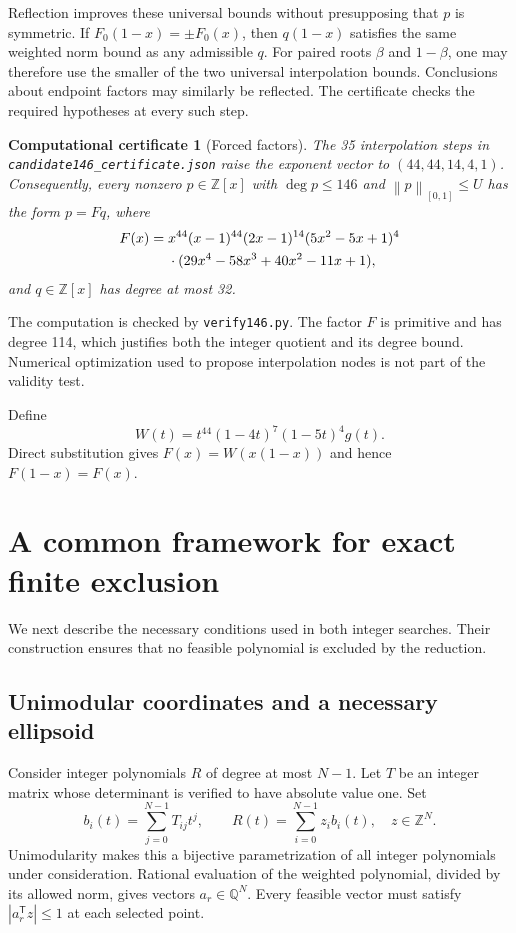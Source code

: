 \documentclass[11pt,a4paper]{article}
\newtheorem{certificate}[theorem]{Computational certificate}
\newcommand{\Z}{\mathbb Z}
\newcommand{\Q}{\mathbb Q}
\newcommand{\norm}[1]{\left\lVert#1\right\rVert}
\newcommand{\file}[1]{{\small\nolinkurl{#1}}}
\begin{document}
Reflection improves these universal bounds without presupposing that $p$ is symmetric. If $F_0(1-x)=\pm F_0(x)$, then $q(1-x)$ satisfies the same weighted norm bound as any admissible $q$. For paired roots $\beta$ and $1-\beta$, one may therefore use the smaller of the two universal interpolation bounds. Conclusions about endpoint factors may similarly be reflected. The certificate checks the required hypotheses at every such step.

\begin{certificate}[Forced factors]\label{cert:factor}
The 35 interpolation steps in \file{candidate146_certificate.json} raise the exponent vector to $(44,44,14,4,1)$. Consequently, every nonzero $p\in\Z[x]$ with $\deg p\le146$ and $\norm p_{[0,1]}\le U$ has the form $p=Fq$, where
\begin{align}
F(x)={}&x^{44}(x-1)^{44}(2x-1)^{14}(5x^2-5x+1)^4\notag\\
&\cdot(29x^4-58x^3+40x^2-11x+1),\label{eq:F}
\end{align}
and $q\in\Z[x]$ has degree at most 32.
\end{certificate}
The computation is checked by \file{verify146.py}. The factor $F$ is primitive and has degree 114, which justifies both the integer quotient and its degree bound. Numerical optimization used to propose interpolation nodes is not part of the validity test.

Define
\begin{equation}\label{eq:W}
W(t)=t^{44}(1-4t)^7(1-5t)^4g(t).
\end{equation}
Direct substitution gives $F(x)=W(x(1-x))$ and hence $F(1-x)=F(x)$.

\section{A common framework for exact finite exclusion}\label{sec:method}
We next describe the necessary conditions used in both integer searches. Their construction ensures that no feasible polynomial is excluded by the reduction.

\subsection{Unimodular coordinates and a necessary ellipsoid}
Consider integer polynomials $R$ of degree at most $N-1$. Let $T$ be an integer matrix whose determinant is verified to have absolute value one. Set
\[
b_i(t)=\sum_{j=0}^{N-1}T_{ij}t^j,\qquad
R(t)=\sum_{i=0}^{N-1}z_i b_i(t),\quad z\in\Z^N.
\]
Unimodularity makes this a bijective parametrization of all integer polynomials under consideration. Rational evaluation of the weighted polynomial, divided by its allowed norm, gives vectors $a_r\in\Q^N$. Every feasible vector must satisfy $|a_r^{\mathsf T}z|\le1$ at each selected point.
\end{document}
